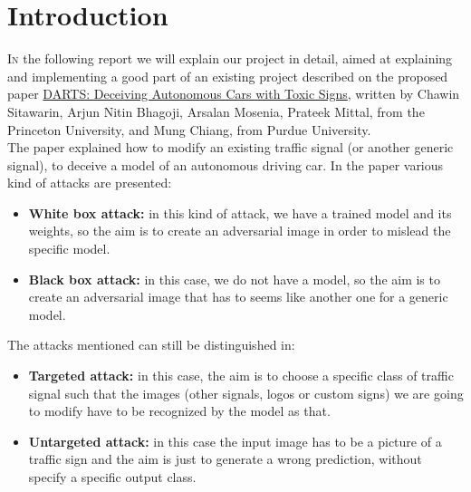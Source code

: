 


\maketitle


\section{Introduction}

\lettrine[nindent=0em,lines=3]{I}n the following report we will explain our project in detail, aimed at explaining and implementing a good part of an existing project  described on the proposed paper \href{https://drive.google.com/open?id=1qBeGzMsa_wpiBdBe1HPRk_mxsomRyZY-}{DARTS: Deceiving Autonomous Cars with Toxic Signs}, written by Chawin Sitawarin, Arjun Nitin Bhagoji, Arsalan Mosenia, Prateek Mittal, from the  Princeton University, and Mung Chiang, from Purdue University.\\
\newline
The paper explained how to modify an existing traffic signal (or another generic signal), to deceive a model of an autonomous driving car.
In the paper various kind of attacks are presented:
\begin{itemize}
	\item \textbf{White box attack:} in this kind of attack, we have a trained model and its weights, so the aim is to create an adversarial image in order to mislead the specific model.
\newline
	\item \textbf{Black box attack:} in this case, we do not have a model, so the aim is to create an adversarial image that has to seems like another one for a generic model.
\end{itemize}
\newpage
The attacks mentioned can still be distinguished in:
\begin{itemize}
	\item \textbf{Targeted attack:} in this case, the aim is to choose a specific class of traffic signal such that the images (other signals, logos or custom signs) we are going to modify have to be recognized by the model as that.
\newline
	\item \textbf{Untargeted attack:} in this case the input image has to be a picture of a traffic sign and the aim is just to generate a wrong prediction, without specify a specific output class.
\end{itemize}

